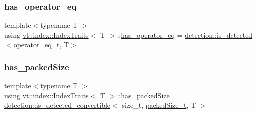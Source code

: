 \mbox{\label{structvt_1_1index_1_1_index_traits_a93695cc99aee3cbdc63a3e2ab9b3f6be}} 
\subsubsection{\texorpdfstring{has\+\_\+operator\+\_\+eq}{has\_operator\_eq}}
{\footnotesize\ttfamily template$<$typename T $>$ \\
using \hyperlink{structvt_1_1index_1_1_index_traits}{vt\+::index\+::\+Index\+Traits}$<$ T $>$\+::\hyperlink{structvt_1_1index_1_1_index_traits_a93695cc99aee3cbdc63a3e2ab9b3f6be}{has\+\_\+operator\+\_\+eq} =  \hyperlink{namespacedetection_a30893549a3de1e9603d78dad6d5dce92}{detection\+::is\+\_\+detected}$<$\hyperlink{structvt_1_1index_1_1_index_traits_a23832f22385d2d20bb1fc9885aef6146}{operator\+\_\+eq\+\_\+t}, T$>$}

\mbox{\label{structvt_1_1index_1_1_index_traits_a257797ee702aa2108e9950f9aba373a4}} 
\subsubsection{\texorpdfstring{has\+\_\+packed\+Size}{has\_packedSize}}
{\footnotesize\ttfamily template$<$typename T $>$ \\
using \hyperlink{structvt_1_1index_1_1_index_traits}{vt\+::index\+::\+Index\+Traits}$<$ T $>$\+::\hyperlink{structvt_1_1index_1_1_index_traits_a257797ee702aa2108e9950f9aba373a4}{has\+\_\+packed\+Size} =  \hyperlink{namespacedetection_afb970b23e39cfecb33449d40242c49ff}{detection\+::is\+\_\+detected\+\_\+convertible}$<$ size\+\_\+t, \hyperlink{structvt_1_1index_1_1_index_traits_a6d511f10a88cd9fb5b4d832127ce5044}{packed\+Size\+\_\+t}, T $>$}

\mbox{\label{structvt_1_1index_1_1_index_traits_ae91e2c26896622d9eab9416b4141042f}} 
